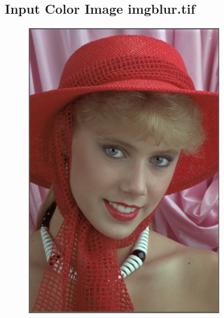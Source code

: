 \documentclass{article}
\begin{document}
\subsection{Input Color Image imgblur.tif}
\begin{figure}[H]
    \centering
    \includegraphics[width=0.75\textwidth]{../results/imgblur.png}
    \begin{center}
    \end{center}
\end{figure}
\end{document}
